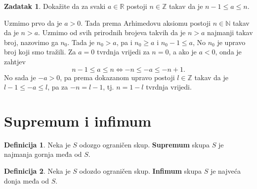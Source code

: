 \documentclass{book}
\renewenvironment{proof}{%
    \vspace{-\parskip}\begin{oldproof}%
    }{%
    \end{oldproof}%
}
\theoremstyle{definition}
\theoremstyle{definition}
\newtheorem{definition}{Definicija}
\newtheorem{exercise}{Zadatak}
\theoremstyle{remark}
\begin{document}
\begin{exercise}
Dokažite da za svaki $a\in \mathbb{R}$ postoji $n\in \mathbb{Z}$ takav da je $n-1\leq a\leq n$.
\end{exercise}
\begin{proof}[Rješenje]
Uzmimo prvo da je $a>0$. Tada prema Arhimedovu aksiomu postoji $n\in \mathbb{N}$ takav da je $n>a$. Uzmimo od svih prirodnih brojeva takvih da je $n>a$ najmanji takav broj, nazovimo ga $n_0$. Tada je $n_0>a$, pa i $n_0\geq a$ i $n_0-1\leq a$, No $n_0$ je upravo broj koji smo tražili. Za $a=0$ tvrdnja vrijedi za $n=0$, a ako je $a<0$, onda je zahtjev 
$$n-1\leq a\leq n
\Longleftrightarrow -n\leq -a\leq -n+1.$$ 
No sada je $-a>0$, pa prema dokazanom upravo postoji $l\in \mathbb{Z}$ takav da je $l-1\leq -a\leq l$, pa za $-n=l-1$, tj. $n=1-l$ tvrdnja vrijedi.
\end{proof}

\section{Supremum i infimum}

\begin{definition}
Neka je $S$ odozgo ograničen skup. \textbf{Supremum} skupa $S$ je najmanja gornja međa od $S$.
\end{definition}

\begin{definition}
Neka je $S$ odozdo ograničen skup. \textbf{Infimum} skupa $S$ je najveća donja međa od $S$.
\end{definition}
\end{document}
